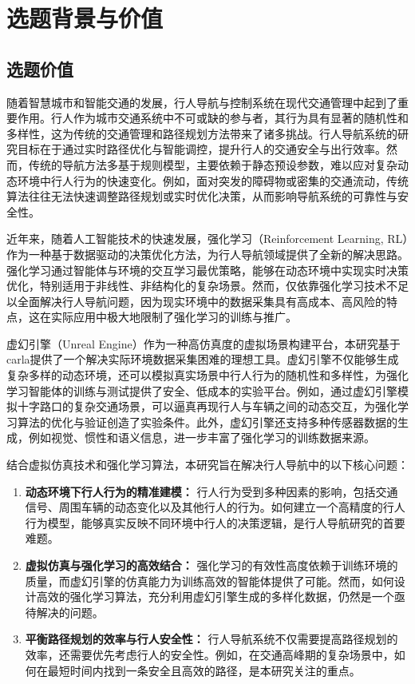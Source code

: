 \chapter{选题背景与价值}

\section{选题价值}

随着智慧城市和智能交通的发展，行人导航与控制系统在现代交通管理中起到了重要作用。行人作为城市交通系统中不可或缺的参与者，其行为具有显著的随机性和多样性，这为传统的交通管理和路径规划方法带来了诸多挑战。行人导航系统的研究目标在于通过实时路径优化与智能调控，提升行人的交通安全与出行效率。然而，传统的导航方法多基于规则模型，主要依赖于静态预设参数，难以应对复杂动态环境中行人行为的快速变化。例如，面对突发的障碍物或密集的交通流动，传统算法往往无法快速调整路径规划或实时优化决策，从而影响导航系统的可靠性与安全性。

近年来，随着人工智能技术的快速发展，强化学习（Reinforcement Learning, RL）作为一种基于数据驱动的决策优化方法，为行人导航领域提供了全新的解决思路。强化学习通过智能体与环境的交互学习最优策略，能够在动态环境中实现实时决策优化，特别适用于非线性、非结构化的复杂场景。然而，仅依靠强化学习技术不足以全面解决行人导航问题，因为现实环境中的数据采集具有高成本、高风险的特点，这在实际应用中极大地限制了强化学习的训练与推广。

虚幻引擎（Unreal Engine）作为一种高仿真度的虚拟场景构建平台，本研究基于carla提供了一个解决实际环境数据采集困难的理想工具。虚幻引擎不仅能够生成复杂多样的动态环境，还可以模拟真实场景中行人行为的随机性和多样性，为强化学习智能体的训练与测试提供了安全、低成本的实验平台。例如，通过虚幻引擎模拟十字路口的复杂交通场景，可以逼真再现行人与车辆之间的动态交互，为强化学习算法的优化与验证创造了实验条件。此外，虚幻引擎还支持多种传感器数据的生成，例如视觉、惯性和语义信息，进一步丰富了强化学习的训练数据来源。

结合虚拟仿真技术和强化学习算法，本研究旨在解决行人导航中的以下核心问题：

\begin{enumerate}
    \item \textbf{动态环境下行人行为的精准建模：} 行人行为受到多种因素的影响，包括交通信号、周围车辆的动态变化以及其他行人的行为。如何建立一个高精度的行人行为模型，能够真实反映不同环境中行人的决策逻辑，是行人导航研究的首要难题。
    \item \textbf{虚拟仿真与强化学习的高效结合：} 强化学习的有效性高度依赖于训练环境的质量，而虚幻引擎的仿真能力为训练高效的智能体提供了可能。然而，如何设计高效的强化学习算法，充分利用虚幻引擎生成的多样化数据，仍然是一个亟待解决的问题。
    \item \textbf{平衡路径规划的效率与行人安全性：} 行人导航系统不仅需要提高路径规划的效率，还需要优先考虑行人的安全性。例如，在交通高峰期的复杂场景中，如何在最短时间内找到一条安全且高效的路径，是本研究关注的重点。
\end{enumerate}

